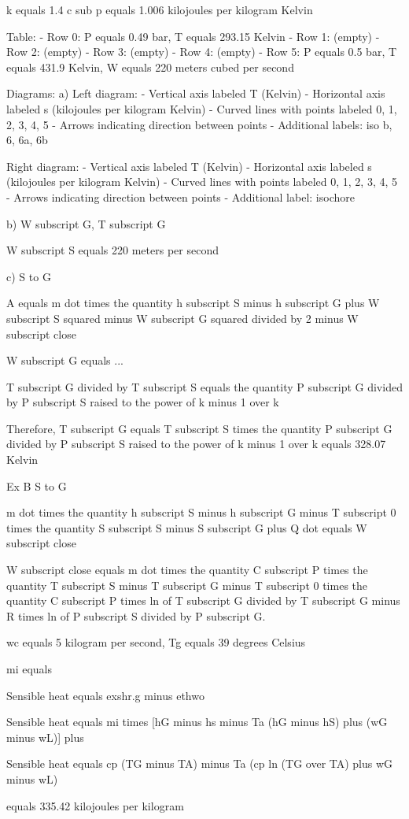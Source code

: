 k equals 1.4  
c sub p equals 1.006 kilojoules per kilogram Kelvin

Table:
- Row 0: P equals 0.49 bar, T equals 293.15 Kelvin
- Row 1: (empty)
- Row 2: (empty)
- Row 3: (empty)
- Row 4: (empty)
- Row 5: P equals 0.5 bar, T equals 431.9 Kelvin, W equals 220 meters cubed per second

Diagrams:
a) Left diagram: 
- Vertical axis labeled T (Kelvin)
- Horizontal axis labeled s (kilojoules per kilogram Kelvin)
- Curved lines with points labeled 0, 1, 2, 3, 4, 5
- Arrows indicating direction between points
- Additional labels: iso b, 6, 6a, 6b

Right diagram:
- Vertical axis labeled T (Kelvin)
- Horizontal axis labeled s (kilojoules per kilogram Kelvin)
- Curved lines with points labeled 0, 1, 2, 3, 4, 5
- Arrows indicating direction between points
- Additional label: isochore

b) W subscript G, T subscript G

W subscript S equals 220 meters per second

c) S to G

A equals m dot times the quantity h subscript S minus h subscript G plus W subscript S squared minus W subscript G squared divided by 2 minus W subscript close

W subscript G equals ...

T subscript G divided by T subscript S equals the quantity P subscript G divided by P subscript S raised to the power of k minus 1 over k

Therefore, T subscript G equals T subscript S times the quantity P subscript G divided by P subscript S raised to the power of k minus 1 over k equals 328.07 Kelvin

Ex B S to G

m dot times the quantity h subscript S minus h subscript G minus T subscript 0 times the quantity S subscript S minus S subscript G plus Q dot equals W subscript close

W subscript close equals m dot times the quantity C subscript P times the quantity T subscript S minus T subscript G minus T subscript 0 times the quantity C subscript P times ln of T subscript G divided by T subscript G minus R times ln of P subscript S divided by P subscript G.

wc equals 5 kilogram per second, Tg equals 39 degrees Celsius

mi equals

Sensible heat equals exshr.g minus ethwo

Sensible heat equals mi times [hG minus hs minus Ta (hG minus hS) plus (wG minus wL)] plus

Sensible heat equals cp (TG minus TA) minus Ta (cp ln (TG over TA) plus wG minus wL)

equals 335.42 kilojoules per kilogram